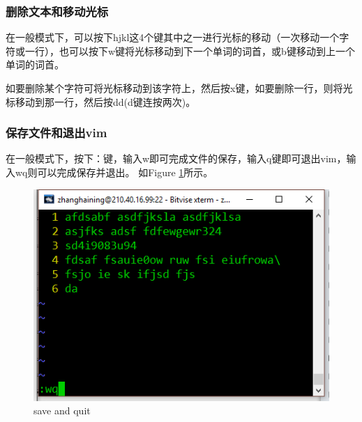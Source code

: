 \subsubsection{删除文本和移动光标}
在一般模式下，可以按下hjkl这4个键其中之一进行光标的移动（一次移动一个字符或一行），也可以按下w键将光标移动到下一个单词的词首，或b键移动到上一个单词的词首。

如要删除某个字符可将光标移动到该字符上，然后按x键，如要删除一行，则将光标移动到那一行，然后按dd(d键连按两次)。
\subsubsection{保存文件和退出vim}
在一般模式下，按下：键，输入w即可完成文件的保存，输入q键即可退出vim，输入wq则可以完成保存并退出。
如Figure \ref{BOvim3}所示。
\begin{figure}
\includegraphics[width=1\linewidth]{BasicOperation/BOvim3}
\caption{save and quit}
\label{BOvim3}
\end{figure}
